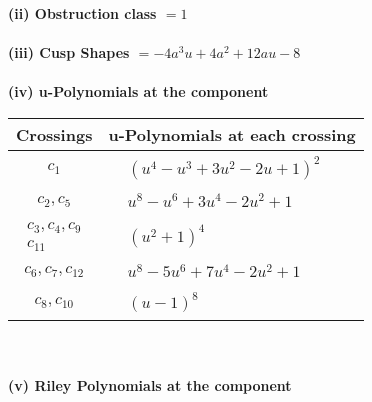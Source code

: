 \documentclass[1p]{elsarticle_modified}
\theoremstyle{definition}
\begin{document}
\flushleft \textbf{(ii) Obstruction class $= 1$}\\~\\
\flushleft \textbf{(iii) Cusp Shapes $= -4 a^3 u+4 a^2+12 a u-8$}\\~\\
\newpage\renewcommand{\arraystretch}{1}
\flushleft \textbf{(iv) u-Polynomials at the component}\newline \\
\begin{tabular}{m{50pt}|m{274pt}}
Crossings & \hspace{64pt}u-Polynomials at each crossing \\
\hline $$\begin{aligned}c_{1}\end{aligned}$$&$\begin{aligned}
&(u^4- u^3+3 u^2-2 u+1)^2
\end{aligned}$\\
\hline $$\begin{aligned}c_{2},c_{5}\end{aligned}$$&$\begin{aligned}
&u^8- u^6+3 u^4-2 u^2+1
\end{aligned}$\\
\hline $$\begin{aligned}c_{3},c_{4},c_{9}\\c_{11}\end{aligned}$$&$\begin{aligned}
&(u^2+1)^4
\end{aligned}$\\
\hline $$\begin{aligned}c_{6},c_{7},c_{12}\end{aligned}$$&$\begin{aligned}
&u^8-5 u^6+7 u^4-2 u^2+1
\end{aligned}$\\
\hline $$\begin{aligned}c_{8},c_{10}\end{aligned}$$&$\begin{aligned}
&(u-1)^8
\end{aligned}$\\
\hline
\end{tabular}\\~\\
\newpage\renewcommand{\arraystretch}{1}
\flushleft \textbf{(v) Riley Polynomials at the component}\newline \\
\end{document}
